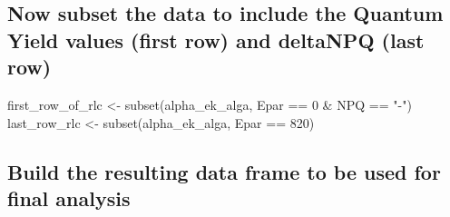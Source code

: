 \documentclass[
]{article}
\newenvironment{Shaded}{\begin{snugshade}}{\end{snugshade}}
\newcommand{\AttributeTok}[1]{\textcolor[rgb]{0.77,0.63,0.00}{#1}}
\newcommand{\ControlFlowTok}[1]{\textcolor[rgb]{0.13,0.29,0.53}{\textbf{#1}}}
\newcommand{\DecValTok}[1]{\textcolor[rgb]{0.00,0.00,0.81}{#1}}
\newcommand{\FunctionTok}[1]{\textcolor[rgb]{0.00,0.00,0.00}{#1}}
\newcommand{\NormalTok}[1]{#1}
\newcommand{\OtherTok}[1]{\textcolor[rgb]{0.56,0.35,0.01}{#1}}
\newcommand{\SpecialCharTok}[1]{\textcolor[rgb]{0.00,0.00,0.00}{#1}}
\newcommand{\StringTok}[1]{\textcolor[rgb]{0.31,0.60,0.02}{#1}}
\begin{document}
\begin{Shaded}
\end{Shaded}

\hypertarget{now-subset-the-data-to-include-the-quantum-yield-values-first-row-and-deltanpq-last-row}{%
\subsection{Now subset the data to include the Quantum Yield values
(first row) and deltaNPQ (last
row)}\label{now-subset-the-data-to-include-the-quantum-yield-values-first-row-and-deltanpq-last-row}}

\begin{Shaded}
\begin{Highlighting}[]
\NormalTok{first\_row\_of\_rlc }\OtherTok{\textless{}{-}} \FunctionTok{subset}\NormalTok{(alpha\_ek\_alga, Epar }\SpecialCharTok{==} \DecValTok{0} \SpecialCharTok{\&}\NormalTok{ NPQ }\SpecialCharTok{==} \StringTok{"{-}"}\NormalTok{)}
\NormalTok{last\_row\_rlc }\OtherTok{\textless{}{-}} \FunctionTok{subset}\NormalTok{(alpha\_ek\_alga, Epar }\SpecialCharTok{==} \DecValTok{820}\NormalTok{)}
\end{Highlighting}
\end{Shaded}

\hypertarget{build-the-resulting-data-frame-to-be-used-for-final-analysis}{%
\subsection{Build the resulting data frame to be used for final
analysis}\label{build-the-resulting-data-frame-to-be-used-for-final-analysis}}
\end{document}
